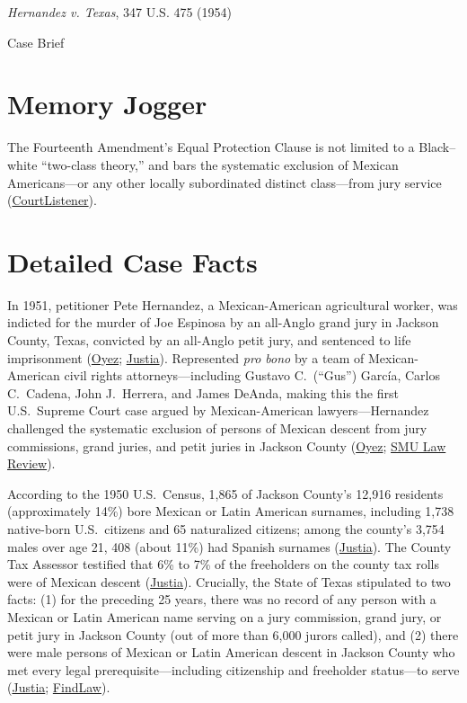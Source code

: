 \documentclass[12pt]{article}
\begin{document}
\begin{center}
{\LARGE \textit{Hernandez v. Texas}, 347 U.S. 475 (1954)\par}
\vspace{0.8em}
{\large Case Brief\par}
\end{center}
\vspace{1em}

\section{Memory Jogger}
The Fourteenth Amendment's Equal Protection Clause is not limited to a Black--white ``two-class theory,'' and bars the systematic exclusion of Mexican Americans---or any other locally subordinated distinct class---from jury service (\href{https://www.courtlistener.com/opinion/105220/hernandez-v-texas/}{CourtListener}).

\section{Detailed Case Facts}
In 1951, petitioner Pete Hernandez, a Mexican-American agricultural worker, was indicted for the murder of Joe Espinosa by an all-Anglo grand jury in Jackson County, Texas, convicted by an all-Anglo petit jury, and sentenced to life imprisonment (\href{https://www.oyez.org/cases/1940-1955/347us475}{Oyez}; \href{https://supreme.justia.com/cases/federal/us/347/475/}{Justia}). Represented \textit{pro bono} by a team of Mexican-American civil rights attorneys---including Gustavo C.\ (``Gus'') Garc\'{i}a, Carlos C.\ Cadena, John J.\ Herrera, and James DeAnda, making this the first U.S.\ Supreme Court case argued by Mexican-American lawyers---Hernandez challenged the systematic exclusion of persons of Mexican descent from jury commissions, grand juries, and petit juries in Jackson County (\href{https://www.oyez.org/cases/1940-1955/347us475}{Oyez}; \href{https://scholar.smu.edu/cgi/viewcontent.cgi?article=1879&context=law_faculty}{SMU Law Review}).

According to the 1950 U.S.\ Census, 1,865 of Jackson County's 12,916 residents (approximately 14\%) bore Mexican or Latin American surnames, including 1,738 native-born U.S.\ citizens and 65 naturalized citizens; among the county's 3,754 males over age 21, 408 (about 11\%) had Spanish surnames (\href{https://supreme.justia.com/cases/federal/us/347/475/}{Justia}). The County Tax Assessor testified that 6\% to 7\% of the freeholders on the county tax rolls were of Mexican descent (\href{https://supreme.justia.com/cases/federal/us/347/475/}{Justia}). Crucially, the State of Texas stipulated to two facts: (1) for the preceding 25 years, there was no record of any person with a Mexican or Latin American name serving on a jury commission, grand jury, or petit jury in Jackson County (out of more than 6,000 jurors called), and (2) there were male persons of Mexican or Latin American descent in Jackson County who met every legal prerequisite---including citizenship and freeholder status---to serve (\href{https://supreme.justia.com/cases/federal/us/347/475/}{Justia}; \href{https://caselaw.findlaw.com/court/us-supreme-court/347/475.html}{FindLaw}).
\end{document}
